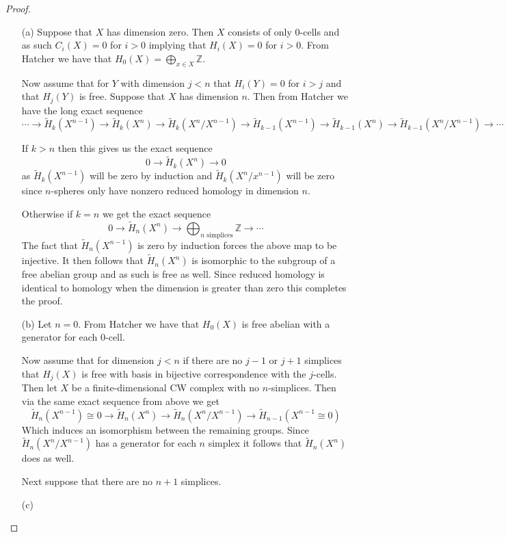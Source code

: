 \documentclass[10pt]{article}
\newcommand{\bb}[1]{\mathbb{#1}}
\newcommand{\wt}[1]{\widetilde{#1}}
\theoremstyle{plain}
\theoremstyle{remark}
\begin{document}
\begin{proof}
  \begin{enumerate}
  \item[(a)]
    Suppose that $X$ has dimension zero. Then $X$ consists of only $0$-cells
    and as such $C_i(X)=0$ for $i>0$ implying that $H_i(X)=0$ for $i>0$. From
    Hatcher we have that $H_0(X)=\bigoplus_{x\in X}\bb{Z}$.

    Now assume that for $Y$ with dimension $j<n$ that $H_i(Y)=0$ for $i>j$ and
    that $H_j(Y)$ is free. Suppose that $X$ has dimension $n$. Then from Hatcher
    we have the long exact sequence
    \[
      \cdots \rightarrow \wt{H}_k(X^{n-1})\rightarrow \wt{H}_k(X^n) \rightarrow \wt{H}_k(X^n/X^{n-1}) \rightarrow \wt{H}_{k-1}(X^{n-1}) \rightarrow \wt{H}_{k-1}(X^n) \rightarrow \wt{H}_{k-1}(X^n/X^{n-1}) \rightarrow \cdots
    \]

    If $k>n$ then this gives us the exact sequence
    \[
      0\rightarrow \wt{H}_k(X^n)\rightarrow 0
    \]
    as $\wt{H}_k(X^{n-1})$ will be zero by induction and $\wt{H}_k(X^n/x^{n-1})$ will
    be zero since $n$-spheres only have nonzero reduced homology in dimension $n$.

    Otherwise if $k=n$ we get the exact sequence
    \[
      0\rightarrow \wt{H}_n(X^n)\rightarrow \bigoplus_{n\text{ simplices}}\bb{Z}\rightarrow\cdots
    \]
    The fact that $\wt{H}_n(X^{n-1})$ is zero by induction forces the above map
    to be injective. It then follows that $\wt{H}_n(X^n)$ is isomorphic to the
    subgroup of a free abelian group and as such is free as well. Since reduced
    homology is identical to homology when the dimension is greater than zero
    this completes the proof.
    
  \item[(b)] Let $n=0$. From Hatcher we have that $H_0(X)$ is free abelian
    with a generator for each 0-cell.

    Now assume that for dimension $j<n$ if there are no $j-1$ or $j+1$ simplices
    that $H_j(X)$ is free with basis in bijective correspondence with the $j$-cells.
    Then let $X$ be a finite-dimensional CW complex with no $n$-simplices. Then
    via the same exact sequence from above we get
    \[
      \wt{H}_n(X^{n-1})\cong 0\rightarrow\wt{H}_n(X^n)\rightarrow\wt{H}_n(X^n/X^{n-1})\rightarrow\wt{H}_{n-1}(X^{n-1}\cong 0)
    \]
    Which induces an isomorphism between the remaining groups. Since
    $\wt{H}_n(X^n/X^{n-1})$ has a generator for each $n$ simplex it follows
    that $\wt{H}_n(X^n)$ does as well.

    Next suppose that there are no $n+1$ simplices.
  \item[(c)]
  \end{enumerate}
\end{proof}
\end{document}
